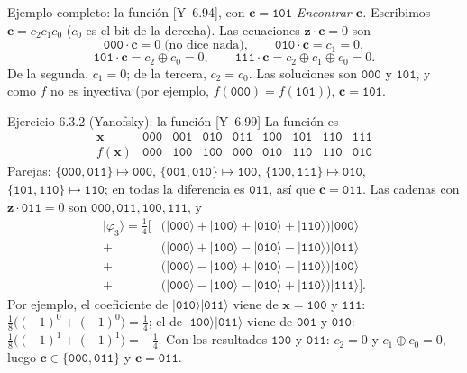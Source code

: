 \documentclass[11pt, a4paper, twoside, openright]{report}
\providecommand{\ket}[1]{|#1\rangle}
\newcommand{\bx}{\mathbf{x}}
\newcommand{\bz}{\mathbf{z}}
\newcommand{\bc}{\mathbf{c}}
\newcommand{\Yan}[1]{\textcolor{rosaviejo}{\small[Y~#1]}}  %
\begin{document}
\begin{ejemplo}{Ejemplo completo: la función \Yan{6.94}, con $\bc = \texttt{101}$}
\textit{Encontrar $\bc$.} Escribimos $\bc = c_2c_1c_0$ ($c_0$ es el bit de la derecha). Las ecuaciones $\bz\cdot\bc = 0$ son
\[ \texttt{000}\cdot\bc = 0 \;\text{(no dice nada)}, \qquad \texttt{010}\cdot\bc = c_1 = 0, \]
\[ \texttt{101}\cdot\bc = c_2\oplus c_0 = 0, \qquad \texttt{111}\cdot\bc = c_2\oplus c_1\oplus c_0 = 0. \]
De la segunda, $c_1 = 0$; de la tercera, $c_2 = c_0$. Las soluciones son $\texttt{000}$ y $\texttt{101}$, y como $f$ no es inyectiva (por ejemplo, $f(\texttt{000}) = f(\texttt{101})$), $\bc = \texttt{101}$.
\end{ejemplo}

\begin{ejercicio}{Ejercicio 6.3.2 (Yanofsky): la función \Yan{6.99}}
La función es
\[
\begin{array}{c|cccccccc}
\bx & \texttt{000} & \texttt{001} & \texttt{010} & \texttt{011} & \texttt{100} & \texttt{101} & \texttt{110} & \texttt{111} \\ \hline
f(\bx) & \texttt{000} & \texttt{100} & \texttt{100} & \texttt{000} & \texttt{010} & \texttt{110} & \texttt{110} & \texttt{010}
\end{array}
\]
Parejas: $\{\texttt{000},\texttt{011}\}\mapsto\texttt{000}$, $\{\texttt{001},\texttt{010}\}\mapsto\texttt{100}$, $\{\texttt{100},\texttt{111}\}\mapsto\texttt{010}$, $\{\texttt{101},\texttt{110}\}\mapsto\texttt{110}$; en todas la diferencia es $\texttt{011}$, así que $\bc = \texttt{011}$. Las cadenas con $\bz\cdot\texttt{011} = 0$ son $\texttt{000}, \texttt{011}, \texttt{100}, \texttt{111}$, y
\begin{align*}
\ket{\varphi_3} = \tfrac14\Big[ &\big(\ket{\texttt{000}} + \ket{\texttt{100}} + \ket{\texttt{010}} + \ket{\texttt{110}}\big)\ket{\texttt{000}} \\ + &\big(\ket{\texttt{000}} + \ket{\texttt{100}} - \ket{\texttt{010}} - \ket{\texttt{110}}\big)\ket{\texttt{011}} \\
+ &\big(\ket{\texttt{000}} - \ket{\texttt{100}} + \ket{\texttt{010}} - \ket{\texttt{110}}\big)\ket{\texttt{100}} \\ + &\big(\ket{\texttt{000}} - \ket{\texttt{100}} - \ket{\texttt{010}} + \ket{\texttt{110}}\big)\ket{\texttt{111}} \Big].
\end{align*}
Por ejemplo, el coeficiente de $\ket{\texttt{010}}\ket{\texttt{011}}$ viene de $\bx = \texttt{100}$ y $\texttt{111}$: $\frac18\big((-1)^{0} + (-1)^{0}\big) = \frac14$; el de $\ket{\texttt{100}}\ket{\texttt{011}}$ viene de $\texttt{001}$ y $\texttt{010}$: $\frac18\big((-1)^1 + (-1)^1\big) = -\frac14$. Con los resultados $\texttt{100}$ y $\texttt{011}$: $c_2 = 0$ y $c_1\oplus c_0 = 0$, luego $\bc\in\{\texttt{000}, \texttt{011}\}$ y $\bc = \texttt{011}$.
\end{ejercicio}
\end{document}
